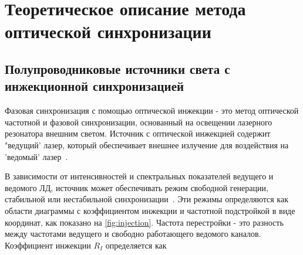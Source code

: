 \section{Теоретическое описание метода оптической синхронизации}\label{ch:ch5/sect2}
\label{sec:theory}

\subsection{Полупроводниковые источники света с инжекционной синхронизацией}

Фазовая синхронизация с помощью оптической инжекции - это метод оптической частотной и фазовой синхронизации, основанный на освещении лазерного резонатора внешним светом. Источник с оптической инжекцией содержит "ведущий' лазер, который обеспечивает внешнее излучение для воздействия на 'ведомый' лазер~\cite{liu2020}. 

В зависимости от интенсивностей и спектральных показателей ведущего и ведомого ЛД, источник может обеспечивать режим свободной генерации, стабильной или нестабильной синхронизации~\cite{lau2008}. Эти режимы определяются как области диаграммы с коэффициентом инжекции и частотной подстройкой в виде координат, как показано на \cref{fig:injection}. Частота перестройки - это разность между частотами ведущего и свободно работающего ведомого каналов. Коэффициент инжекции $R_I$ определяется как 

